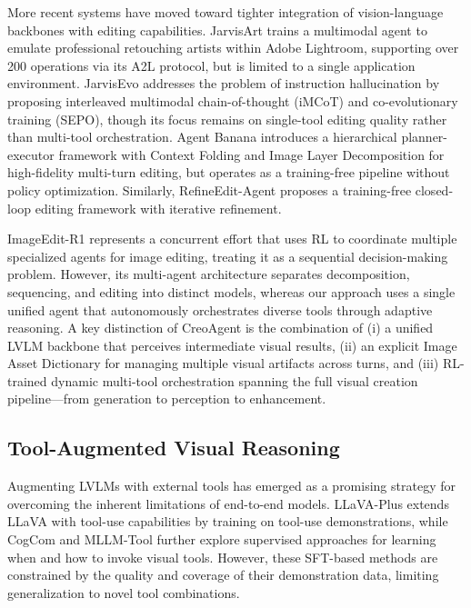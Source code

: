 \documentclass[11pt]{article}
\begin{document}
More recent systems have moved toward tighter integration of vision-language backbones with editing capabilities. JarvisArt \cite{lin2025jarvisart} trains a multimodal agent to emulate professional retouching artists within Adobe Lightroom, supporting over 200 operations via its A2L protocol, but is limited to a single application environment. JarvisEvo \cite{lin2025jarvisevo} addresses the problem of instruction hallucination by proposing interleaved multimodal chain-of-thought (iMCoT) and co-evolutionary training (SEPO), though its focus remains on single-tool editing quality rather than multi-tool orchestration. Agent Banana \cite{ye2026agentbanana} introduces a hierarchical planner-executor framework with Context Folding and Image Layer Decomposition for high-fidelity multi-turn editing, but operates as a training-free pipeline without policy optimization. Similarly, RefineEdit-Agent \cite{refineedit2025} proposes a training-free closed-loop editing framework with iterative refinement.

ImageEdit-R1 \cite{zhao2026imageditr1} represents a concurrent effort that uses RL to coordinate multiple specialized agents for image editing, treating it as a sequential decision-making problem. However, its multi-agent architecture separates decomposition, sequencing, and editing into distinct models, whereas our approach uses a single unified agent that autonomously orchestrates diverse tools through adaptive reasoning. A key distinction of CreoAgent is the combination of (i) a unified LVLM backbone that perceives intermediate visual results, (ii) an explicit Image Asset Dictionary for managing multiple visual artifacts across turns, and (iii) RL-trained dynamic multi-tool orchestration spanning the full visual creation pipeline—from generation to perception to enhancement.

\subsection{Tool-Augmented Visual Reasoning}

Augmenting LVLMs with external tools has emerged as a promising strategy for overcoming the inherent limitations of end-to-end models. LLaVA-Plus \cite{liu2024llavaplus} extends LLaVA with tool-use capabilities by training on tool-use demonstrations, while CogCom \cite{qi2024cogcom} and MLLM-Tool \cite{wang2024mllmtool} further explore supervised approaches for learning when and how to invoke visual tools. However, these SFT-based methods are constrained by the quality and coverage of their demonstration data, limiting generalization to novel tool combinations.
\end{document}
